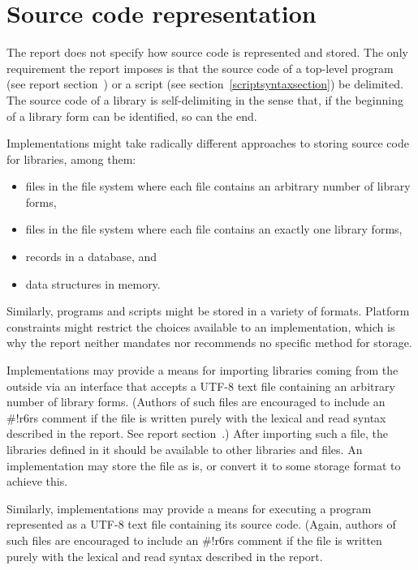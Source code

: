\chapter{Source code representation}
\label{sourcecoderepappendix}

The report does not specify how source code is represented and stored.
The only requirement the report imposes is that the source code of a
top-level program (see report
section~) or a script (see section~\ref{scriptsyntaxsection}) be
delimited.  The source code of a library is self-delimiting in the
sense that, if the beginning of a library form can be identified, so
can the end.

Implementations might take radically different approaches to storing
source code for libraries, among them:
%
\begin{itemize}
\item files in the file system where each file contains an
  arbitrary number of library forms,
\item files in the file system where each file contains an
  exactly one library forms,
\item records in a database, and
\item data structures in memory.
\end{itemize}
%
Similarly, programs and scripts might be stored in a variety of
formats.  Platform constraints might restrict the choices available to
an implementation, which is why the report neither mandates nor
recommends no specific method for storage.

Implementations may provide a means for importing libraries coming from
the outside via an interface that accepts a UTF-8 text file containing
an arbitrary number of library forms.  (Authors of such files are
encouraged to include an {\cf\#!r6rs} comment if the file is written
purely with the lexical and read syntax described in the report.  See report
section~.)  After importing such a file, the libraries defined in
it should be available to other libraries and files.  An
implementation may store the file as is, or convert it to some storage
format to achieve this.

Similarly, implementations may provide a means for executing a program
represented as a UTF-8 text file containing its source code.  (Again,
authors of such files are encouraged to include an {\cf\#!r6rs}
comment if the file is written purely with the lexical and read syntax
described in the report.

